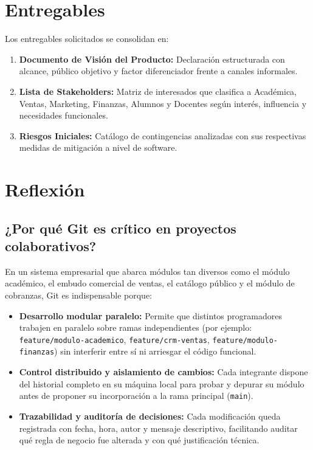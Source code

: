 \documentclass[11pt,a4paper]{article}
\begin{document}
\section{Entregables}
Los entregables solicitados se consolidan en:
\begin{enumerate}
    \item \textbf{Documento de Visión del Producto:} Declaración estructurada con alcance, público objetivo y factor diferenciador frente a canales informales.
    \item \textbf{Lista de Stakeholders:} Matriz de interesados que clasifica a Académica, Ventas, Marketing, Finanzas, Alumnos y Docentes según interés, influencia y necesidades funcionales.
    \item \textbf{Riesgos Iniciales:} Catálogo de contingencias analizadas con sus respectivas medidas de mitigación a nivel de software.
\end{enumerate}

\section{Reflexión}

\subsection{¿Por qué Git es crítico en proyectos colaborativos?}
En un sistema empresarial que abarca módulos tan diversos como el módulo académico, el embudo comercial de ventas, el catálogo público y el módulo de cobranzas, Git es indispensable porque:
\begin{itemize}
    \item \textbf{Desarrollo modular paralelo:} Permite que distintos programadores trabajen en paralelo sobre ramas independientes (por ejemplo: \texttt{feature/modulo-academico}, \texttt{feature/crm-ventas}, \texttt{feature/modulo-finanzas}) sin interferir entre sí ni arriesgar el código funcional.
    \item \textbf{Control distribuido y aislamiento de cambios:} Cada integrante dispone del historial completo en su máquina local para probar y depurar su módulo antes de proponer su incorporación a la rama principal (\texttt{main}).
    \item \textbf{Trazabilidad y auditoría de decisiones:} Cada modificación queda registrada con fecha, hora, autor y mensaje descriptivo, facilitando auditar qué regla de negocio fue alterada y con qué justificación técnica.
\end{itemize}
\end{document}
